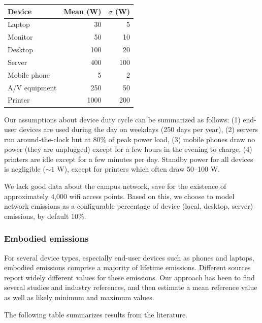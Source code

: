 \documentclass[11pt]{article}
\begin{document}
\begin{center}
  \begin{tabular}{|l|r|r|}
    \hline
    \textbf{Device} & \textbf{Mean (W)} & \textbf{$\sigma$ (W)} \\ \hline
    Laptop & 30 & 5 \\ \hline
    Monitor & 50 & 10 \\ \hline
    Desktop & 100 & 20 \\ \hline
    Server & 400 & 100 \\ \hline
    Mobile phone & 5 & 2 \\ \hline
    A/V equipment & 250 & 50 \\ \hline
    Printer & 1000 & 200 \\ \hline
  \end{tabular}
\end{center}

Our assumptions about device duty cycle can be summarized as follows: (1) end-user devices are used during the day on weekdays (250 days per year), (2) servers run around-the-clock but at 80\% of peak power load, (3) mobile phones draw no power (they are unplugged) except for a few hours in the evening to charge, (4) printers are idle except for a few minutes per day. Standby power for all devices is negligible ($\sim 1$ W), except for printers which often draw 50--100 W.

We lack good data about the campus network, save for the existence of approximately 4,000 wifi access points. Based on this, we choose to model network emissions as a configurable percentage of device (local, desktop, server) emissions, by default 10\%.

\subsubsection*{Embodied emissions}

For several device types, especially end-user devices such as phones and laptops, embodied emissions
comprise a majority of lifetime emissions. Different sources report widely different values for these emissions. Our approach has been to find several studies and industry references, and then estimate a mean reference value as well as likely minimum and maximum values.

The following table summarizes results from the literature.
\end{document}
